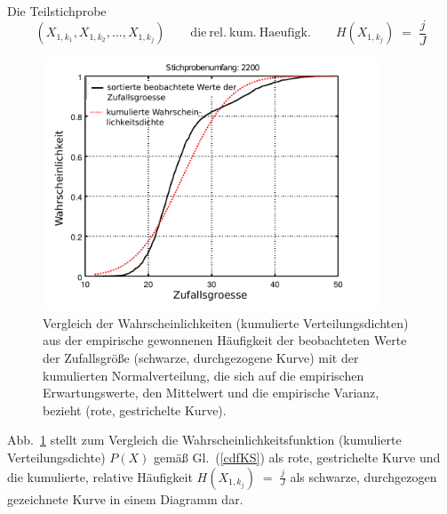 Die Teilstichprobe
\begin{equation}
(X_{1,k_1}, X_{1,k_2}, \dots, X_{1,k_j})
\qquad \mathrm{die~rel.~kum.~Haeufigk.} 
\qquad H(X_{1,k_j}) \; = \; \frac{j}{J}
\label{cdfH}
\end{equation}
\begin{figure}
\begin{center}
\includegraphics[width=100mm]{05_vorlesung/media/KS_pdf_iteration0.pdf}
\caption{\label{cdf4KStest} Vergleich der Wahrscheinlichkeiten (kumulierte Verteilungsdichten) aus der
empirische gewonnenen Häufigkeit der beobachteten Werte der Zufallsgröße
(schwarze, durchgezogene Kurve) mit der kumulierten Normalverteilung, die sich auf
die empirischen Erwartungswerte, den Mittelwert und die empirische Varianz, bezieht (rote,
gestrichelte Kurve).}
\end{center}
\end{figure}

Abb.~\ref{cdf4KStest} stellt zum Vergleich die Wahrscheinlichkeitsfunktion
(kumulierte Verteilungsdichte) $P(X)$ gemäß Gl.~(\ref{cdfKS})
als rote, gestrichelte Kurve und die kumulierte, relative Häufigkeit
$H(X_{1,k_j}) \; = \; \frac{j}{J}$
als schwarze, durchgezogen gezeichnete Kurve in einem Diagramm dar.


